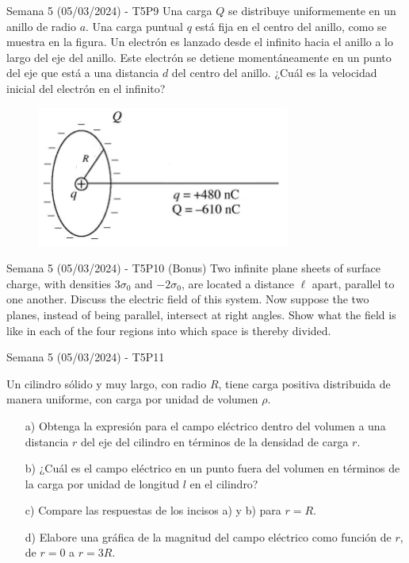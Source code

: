 \begin{frame}{Semana 5 (05/03/2024) - T5P9}
    Una carga $Q$ se distribuye uniformemente en un anillo de radio $a$. Una carga puntual $q$ está fija en el centro del anillo, como se muestra en la figura. Un electrón es lanzado desde el infinito hacia el anillo a lo largo del eje del anillo. Este electrón se detiene momentáneamente en un punto del eje que está a una distancia $d$ del centro del anillo. ¿Cuál es la velocidad inicial del electrón en el infinito?
    
    \begin{figure}
        \centering
        \includegraphics[scale=0.6]{figures/t5p9.png}
    \end{figure}
    
\end{frame}

\begin{frame}{Semana 5 (05/03/2024) - T5P10 (Bonus)}
    Two infinite plane sheets of surface charge, with densities $3\sigma_0$ and $-2\sigma_0$, are located a distance $\ell$ apart, parallel to one another. Discuss the electric field of this system. Now suppose the two planes, instead of being parallel, intersect at right angles. Show what the field is like in each of the four regions into which space is thereby divided.
\end{frame}

\begin{frame}{Semana 5 (05/03/2024) - T5P11}
    
Un cilindro sólido y muy largo, con radio $R$, tiene carga positiva distribuida de manera uniforme, con carga por unidad de volumen $\rho$.

\begin{itemize}
    \item[a)] Obtenga la expresión para el campo eléctrico dentro del volumen a una distancia $r$ del eje del cilindro en términos de la densidad de carga $r$.
    \item[b)] ¿Cuál es el campo eléctrico en un punto fuera del volumen en términos de la carga por unidad de longitud $l$ en el cilindro?
    \item[c)] Compare las respuestas de los incisos a) y  b) para $r = R$. 
    \item[d)] Elabore una gráfica de la magnitud del campo eléctrico como función de $r$, de $r = 0$ a $r = 3R$.
\end{itemize}

\end{frame}

